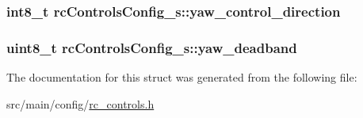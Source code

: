 \hypertarget{structrcControlsConfig__s_a34211474ae7105328dc792e26cd3e94f}{
\subsubsection[{yaw\+\_\+control\+\_\+direction}]{\setlength{\rightskip}{0pt plus 5cm}int8\+\_\+t rc\+Controls\+Config\+\_\+s\+::yaw\+\_\+control\+\_\+direction}}\label{structrcControlsConfig__s_a34211474ae7105328dc792e26cd3e94f}
\hypertarget{structrcControlsConfig__s_acc014749b3aebb39c7758118be2ba1b7}{
\subsubsection[{yaw\+\_\+deadband}]{\setlength{\rightskip}{0pt plus 5cm}uint8\+\_\+t rc\+Controls\+Config\+\_\+s\+::yaw\+\_\+deadband}}\label{structrcControlsConfig__s_acc014749b3aebb39c7758118be2ba1b7}


The documentation for this struct was generated from the following file\+:\begin{DoxyCompactItemize}
\item 
src/main/config/\hyperlink{rc__controls_8h}{rc\+\_\+controls.\+h}\end{DoxyCompactItemize}
